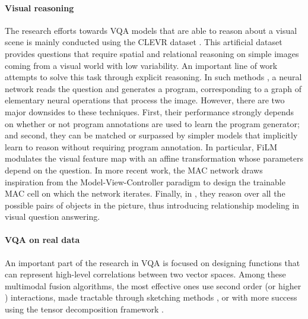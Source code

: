 \documentclass[10pt,twocolumn,letterpaper]{article}
\begin{document}
\paragraph{Visual reasoning}
The research efforts towards VQA models that are able to reason about a visual scene is mainly conducted using the CLEVR dataset \cite{johnson2016clevr}.
This artificial dataset provides questions that require spatial and relational reasoning on simple images coming from a visual world with low variability. 
An important line of work attempts to solve this task through explicit reasoning. In such methods \cite{johnson2017inferring, hu2017learning, Mascharka_2018_CVPR}, a neural network reads the question and generates a program, corresponding to a graph of elementary neural operations that process the image. 
However, there are two major downsides to these techniques. First, their performance strongly depends on whether or not program annotations are used to learn the program generator; 
and second, they can be matched or surpassed by simpler models that implicitly learn to reason without requiring program annotation.
In particular, FiLM \cite{perez2018film} modulates the visual feature map with an affine transformation whose parameters depend on the question. 
In more recent work, the MAC network \cite{arad2018compositional} draws inspiration from the Model-View-Controller paradigm to design the trainable MAC cell on which the network iterates.
Finally, in \cite{SantoroRBMPBL17}, they reason over all the possible pairs of objects in the picture, thus introducing relationship modeling in visual question answering. 


\paragraph{VQA on real data}
An important part of the research in VQA is focused on designing functions that can represent high-level correlations between two vector spaces.
Among these  multimodal fusion algorithms, the most effective ones use second order (or higher \cite{yu2018beyond}) interactions, made tractable through sketching methods
\cite{FukuiPYRDR16}, or with more success using the tensor decomposition framework \cite{Kim2017,benyounescadene2017mutan,yu2017mfb}.
\end{document}
